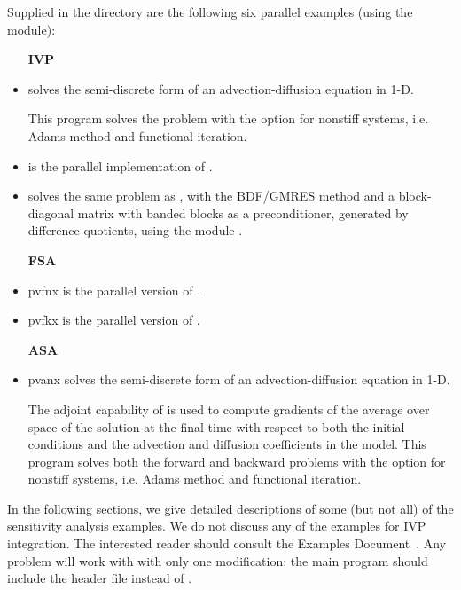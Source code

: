 \vspace{0.2in}
\noindent Supplied in the  directory are
the following six parallel examples (using the {\nvecp} module):
\begin{itemize}

\item[{\bf IVP}]

\item {}
  solves the semi-discrete form of an advection-diffusion equation in 1-D.

  This program solves the problem with the option for nonstiff systems,
  i.e. Adams method and functional iteration.

\item {}
  is the parallel implementation of .

\item {}
  solves the same problem as , with the BDF/GMRES method 
  and a block-diagonal matrix with banded blocks as a preconditioner, 
  generated by difference quotients, using the module {\cvbbdpre}.

\item[{\bf FSA}]

\item{pvfnx}
  is the parallel version of .

\item{pvfkx}
  is the parallel version of .

\item[{\bf ASA}]

\item{pvanx}
  solves the semi-discrete form of an advection-diffusion equation in 1-D.

  The adjoint capability of {\cvodes} is used to compute gradients
  of the average over space of the solution at the final time with
  respect to both the initial conditions and the advection and
  diffusion coefficients in the model.
  This program solves both the forward and backward problems with the option 
  for nonstiff systems, i.e. Adams method and functional iteration.

\end{itemize}

\vspace{0.3in}
\noindent 
In the following sections, we give detailed descriptions of some (but
not all) of the sensitivity analysis examples. We do not discuss any of the 
examples for IVP integration. The interested reader should consult the
{\cvode} Examples Document~\cite{cvode2.2.0_ex}. Any {\cvode} problem
will work with {\cvodes} with only one modification: the main program
should include the header file  instead of .

